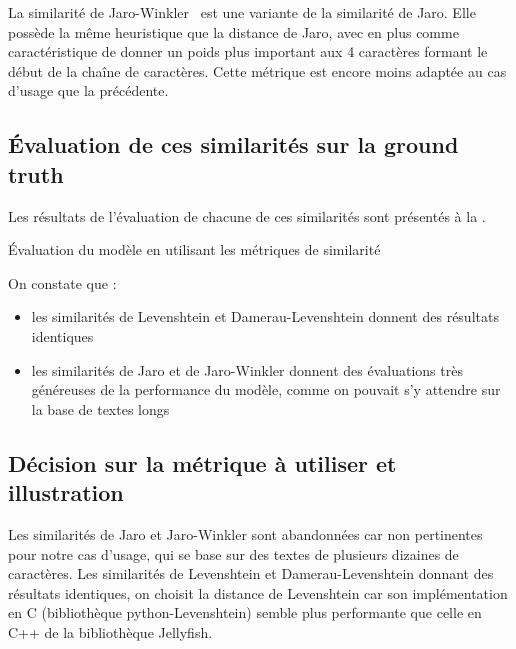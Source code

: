             La similarité de Jaro-Winkler~\cite{jaro_winkler_wiki} est une variante de la similarité de Jaro.
            Elle possède la même heuristique que la distance de Jaro, avec en plus comme caractéristique de donner un poids plus important aux 4 caractères formant le début de la chaîne de caractères.
            Cette métrique est encore moins adaptée au cas d'usage que la précédente.

            \subsection{\'{E}valuation de ces similarités sur la ground truth}

            Les résultats de l'évaluation de chacune de ces similarités sont présentés à la .
            \begin{table}[htbp]
                \begin{center}
                
                \caption{\'{E}valuation du modèle en utilisant les métriques de similarité}
                \label{tbl:similarities_result}
                \end{center}
            \end{table}
            On constate que :
            \begin{itemize}
                \item les similarités de Levenshtein et Damerau-Levenshtein donnent des résultats identiques
                \item les similarités de Jaro et de Jaro-Winkler donnent des évaluations très généreuses de la performance du modèle, comme on pouvait s'y attendre sur la base de textes longs
            \end{itemize}

            \subsection{Décision sur la métrique à utiliser et illustration}
            
            Les similarités de Jaro et Jaro-Winkler sont abandonnées car non pertinentes pour notre cas d'usage, qui se base sur des textes de plusieurs dizaines de caractères.
            Les similarités de Levenshtein et Damerau-Levenshtein donnant des résultats identiques, on choisit la distance de Levenshtein car son implémentation en C (bibliothèque python-Levenshtein) semble plus performante que celle en C++ de la bibliothèque Jellyfish.

